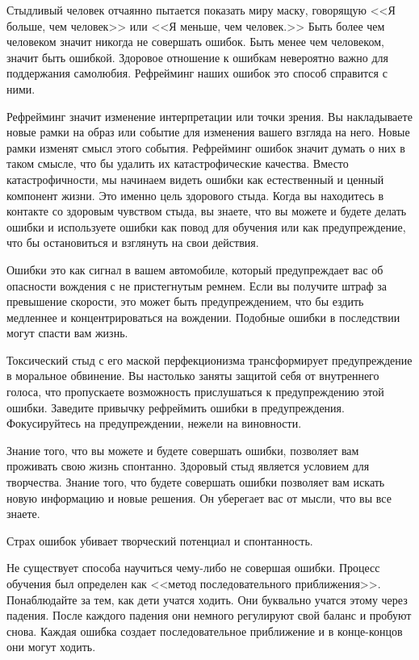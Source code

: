 \documentclass[10pt, fleqn]{article}
\begin{document}

Стыдливый человек отчаянно пытается показать миру маску, говорящую <<Я больше, чем человек>> или <<Я меньше, чем человек.>> Быть более чем человеком значит никогда не совершать ошибок. Быть менее чем человеком, значит быть ошибкой. Здоровое отношение к ошибкам невероятно важно для поддержания самолюбия. Рефрейминг наших ошибок это способ справится с ними.

Рефрейминг значит изменение интерпретации или точки зрения. Вы накладываете новые рамки на образ или событие для изменения вашего взгляда на него. Новые рамки изменят смысл этого события. Рефрейминг ошибок значит думать о них в таком смысле, что бы удалить их катастрофические качества. Вместо катастрофичности, мы начинаем видеть ошибки как естественный и ценный компонент жизни. Это именно цель здорового стыда. Когда вы находитесь в контакте со здоровым чувством стыда, вы знаете, что вы можете и будете делать ошибки и используете ошибки как повод для обучения или как предупреждение, что бы остановиться и взглянуть на свои действия.


Ошибки это как сигнал в вашем автомобиле, который предупреждает вас об опасности вождения с не пристегнутым ремнем. Если вы получите штраф за превышение скорости, это может быть предупреждением, что бы ездить медленнее и концентрироваться на вождении. Подобные ошибки в последствии могут спасти вам жизнь.

Токсический стыд с его маской перфекционизма трансформирует предупреждение в моральное обвинение. Вы настолько заняты защитой себя от внутреннего голоса, что пропускаете возможность прислушаться к предупреждению этой ошибки. Заведите привычку рефреймить ошибки в предупреждения. Фокусируйтесь на предупреждении, нежели на виновности.


Знание того, что вы можете и будете совершать ошибки, позволяет вам проживать свою жизнь спонтанно. Здоровый стыд является условием для творчества. Знание того, что будете совершать ошибки позволяет вам искать новую информацию и новые решения. Он уберегает вас от мысли, что вы все знаете.

Страх ошибок убивает творческий потенциал и спонтанность.


Не существует способа научиться чему-либо не совершая ошибки. Процесс обучения был определен как <<метод последовательного приближения>>. Понаблюдайте за тем, как дети учатся ходить. Они буквально учатся этому через падения. После каждого падения они немного регулируют свой баланс и пробуют снова. Каждая ошибка создает последовательное приближение и в конце-концов они могут ходить.
\end{document}
